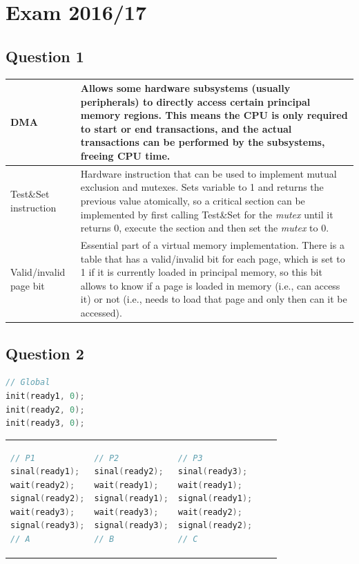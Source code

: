 \setcounter{chapter}{16}
\chapter{Exam 2016/17}
{
\renewcommand{\thesubsection}{\thesection\alph{subsection}}
\section{Question 1}
\begin{tabular}{p{29mm} | p{122mm}}
    DMA & Allows some hardware subsystems (usually peripherals) to directly access certain principal memory regions. This means the CPU is only required to start or end transactions, and the actual transactions can be performed by the subsystems, freeing CPU time. \\ \hline
    Test\&Set instruction & Hardware instruction that can be used to implement mutual exclusion and mutexes. Sets variable to 1 and returns the previous value atomically, so a critical section can be implemented by first calling Test\&Set for the \emph{mutex} until it returns 0, execute the section and then set the \emph{mutex} to 0. \\ \hline
    Valid/invalid page bit & Essential part of a virtual memory implementation. There is a table that has a valid/invalid bit for each page, which is set to 1 if it is currently loaded in principal memory, so this bit allows to know if a page is loaded in memory (i.e., can access it) or not (i.e., needs to load that page and only then can it be accessed).
\end{tabular}

\section{Question 2}
\begin{lstlisting}[language=C]
// Global
init(ready1, 0);
init(ready2, 0);
init(ready3, 0);
\end{lstlisting}
\begin{tabular}{p{49mm} p{49mm} p{49mm}}
    \begin{lstlisting}[language=C]
// P1
sinal(ready1);
wait(ready2);
signal(ready2);
wait(ready3);
signal(ready3);
// A    
    \end{lstlisting} &
    \begin{lstlisting}[language=C]
// P2
sinal(ready2);
wait(ready1);
signal(ready1);
wait(ready3);
signal(ready3);
// B    
    \end{lstlisting} &
    \begin{lstlisting}[language=C]
// P3
sinal(ready3);
wait(ready1);
signal(ready1);
wait(ready2);
signal(ready2);    
// C
    \end{lstlisting}
\end{tabular}

}
